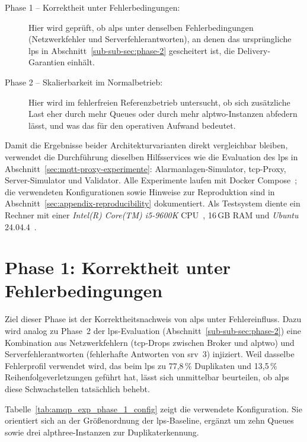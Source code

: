 \begin{description}
    \item[Phase 1 -- Korrektheit unter Fehlerbedingungen:]
          Hier wird geprüft, ob \gls{alps} unter denselben Fehlerbedingungen (Netzwerkfehler und Serverfehlerantworten), an denen das ursprüngliche \gls{lps} in Abschnitt~\ref{sub-sub-sec:phase-2} gescheitert ist, die Delivery-Garantien einhält.

    \item[Phase 2 -- Skalierbarkeit im Normalbetrieb:]
          Hier wird im fehlerfreien Referenzbetrieb untersucht, ob sich zusätzliche Last eher durch mehr Queues oder durch mehr \gls{alptwo}-Instanzen abfedern lässt, und was das für den operativen Aufwand bedeutet.
\end{description}

Damit die Ergebnisse beider Architekturvarianten direkt vergleichbar bleiben, verwendet die Durchführung dieselben Hilfsservices wie die Evaluation des \gls{lps} in Abschnitt~\ref{sec:mqtt-proxy-experimente}: Alarmanlagen-Simulator, \gls{tcp}-Proxy, Server-Simulator und Validator. Alle Experimente laufen mit Docker Compose~\citep{docker_compose}; die verwendeten Konfigurationen sowie Hinweise zur Reproduktion sind in Abschnitt~\ref{sec:appendix-reproducibility} dokumentiert. Als Testsystem diente ein Rechner mit einer \textit{Intel(R) Core(TM) i5-9600K} CPU~\citep{intel_i5_9600k}, 16\,GB RAM und \textit{Ubuntu} 24.04.4~\citep{ubuntu_24_04}.

\section{Phase 1: Korrektheit unter Fehlerbedingungen}
\label{sec:eval-korrektheit}

Ziel dieser Phase ist der Korrektheitsnachweis von \gls{alps} unter Fehlereinfluss. Dazu wird analog zu Phase~2 der \gls{lps}-Evaluation (Abschnitt~\ref{sub-sub-sec:phase-2}) eine Kombination aus Netzwerkfehlern (\gls{tcp}-Drops zwischen Broker und \gls{alptwo}) und Serverfehlerantworten (fehlerhafte Antworten von \gls{srv}~3) injiziert. Weil dasselbe Fehlerprofil verwendet wird, das beim \gls{lps} zu 77{,}8\,\% Duplikaten und 13{,}5\,\% Reihenfolgeverletzungen geführt hat, lässt sich unmittelbar beurteilen, ob \gls{alps} diese Schwachstellen tatsächlich behebt.

Tabelle~\ref{tab:amqp_exp_phase_1_config} zeigt die verwendete Konfiguration. Sie orientiert sich an der Größenordnung der \gls{lps}-Baseline, ergänzt um zehn Queues sowie drei \gls{alpthree}-Instanzen zur Duplikaterkennung.

